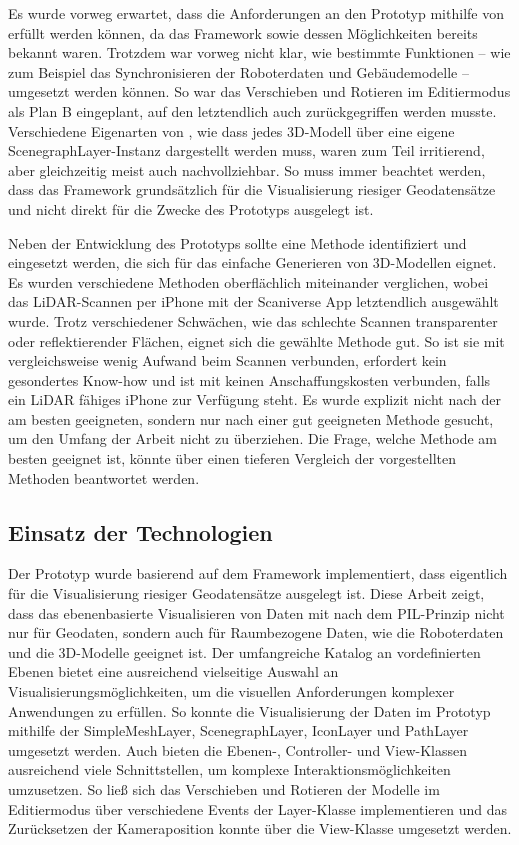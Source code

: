Es wurde vorweg erwartet, dass die Anforderungen an den Prototyp mithilfe von \deckgl{} erfüllt werden können, da das Framework sowie dessen Möglichkeiten bereits bekannt waren. Trotzdem war vorweg nicht klar, wie bestimmte Funktionen – wie zum Beispiel das Synchronisieren der Roboterdaten und Gebäudemodelle – umgesetzt werden können. So war das Verschieben und Rotieren im Editiermodus als Plan B eingeplant, auf den letztendlich auch zurückgegriffen werden musste. Verschiedene Eigenarten von \deckgl{}, wie dass jedes 3D-Modell über eine eigene ScenegraphLayer-Instanz dargestellt werden muss, waren zum Teil irritierend, aber gleichzeitig meist auch nachvollziehbar. So muss immer beachtet werden, dass das Framework grundsätzlich für die Visualisierung riesiger Geodatensätze und nicht direkt für die Zwecke des Prototyps ausgelegt ist.

Neben der Entwicklung des Prototyps sollte eine Methode identifiziert und eingesetzt werden, die sich für das einfache Generieren von 3D-Modellen eignet. Es wurden verschiedene Methoden oberflächlich miteinander verglichen, wobei das \ac{LiDAR}-Scannen per iPhone mit der Scaniverse App letztendlich ausgewählt wurde. Trotz verschiedener Schwächen, wie das schlechte Scannen transparenter oder reflektierender Flächen, eignet sich die gewählte Methode gut. So ist sie mit vergleichsweise wenig Aufwand beim Scannen verbunden, erfordert kein gesondertes Know-how und ist mit keinen Anschaffungskosten verbunden, falls ein \ac{LiDAR} fähiges iPhone zur Verfügung steht. Es wurde explizit nicht nach der am besten geeigneten, sondern nur nach einer gut geeigneten Methode gesucht, um den Umfang der Arbeit nicht zu überziehen. Die Frage, welche Methode am besten geeignet ist, könnte über einen tieferen Vergleich der vorgestellten Methoden beantwortet werden.

\subsection{Einsatz der Technologien}
Der Prototyp wurde basierend auf dem Framework \deckgl{} implementiert, dass eigentlich für die Visualisierung riesiger Geodatensätze ausgelegt ist. Diese Arbeit zeigt, dass das ebenenbasierte Visualisieren von Daten mit \deckgl{} nach dem \ac{PIL}-Prinzip nicht nur für Geodaten, sondern auch für Raumbezogene Daten, wie die Roboterdaten und die 3D-Modelle geeignet ist. Der umfangreiche Katalog an vordefinierten Ebenen bietet eine ausreichend vielseitige Auswahl an Visualisierungsmöglichkeiten, um die visuellen Anforderungen komplexer Anwendungen zu erfüllen. So konnte die Visualisierung der Daten im Prototyp mithilfe der SimpleMeshLayer, ScenegraphLayer, IconLayer und PathLayer umgesetzt werden. Auch bieten die Ebenen-, Controller- und View-Klassen ausreichend viele Schnittstellen, um komplexe Interaktionsmöglichkeiten umzusetzen. So ließ sich das Verschieben und Rotieren der Modelle im Editiermodus über verschiedene Events der Layer-Klasse implementieren und das Zurücksetzen der Kameraposition konnte über die View-Klasse umgesetzt werden.

